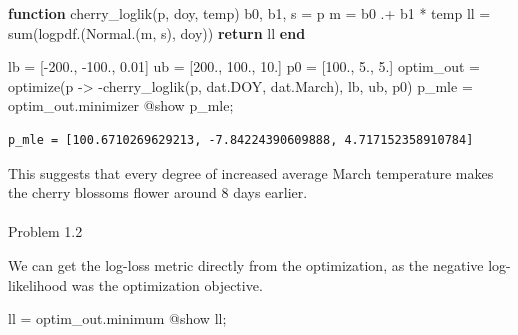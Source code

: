 \documentclass[
  letterpaper,
  DIV=11,
  numbers=noendperiod]{scrartcl}
\makeatletter
\let\oldparagraph\paragraph
\renewcommand{\paragraph}{
    \@ifstar
      \xxxParagraphStar
      \xxxParagraphNoStar
  }
\newcommand{\xxxParagraphStar}[1]{\oldparagraph*{#1}\mbox{}}
\newcommand{\xxxParagraphNoStar}[1]{\oldparagraph{#1}\mbox{}}
\newenvironment{Shaded}{\begin{snugshade}}{\end{snugshade}}
\newcommand{\ControlFlowTok}[1]{\textcolor[rgb]{0.00,0.23,0.31}{\textbf{#1}}}
\newcommand{\FloatTok}[1]{\textcolor[rgb]{0.68,0.00,0.00}{#1}}
\newcommand{\FunctionTok}[1]{\textcolor[rgb]{0.28,0.35,0.67}{#1}}
\newcommand{\KeywordTok}[1]{\textcolor[rgb]{0.00,0.23,0.31}{\textbf{#1}}}
\newcommand{\NormalTok}[1]{\textcolor[rgb]{0.00,0.23,0.31}{#1}}
\newcommand{\OperatorTok}[1]{\textcolor[rgb]{0.37,0.37,0.37}{#1}}
\newcommand{\PreprocessorTok}[1]{\textcolor[rgb]{0.68,0.00,0.00}{#1}}
\makeatother
\begin{document}
\begin{Shaded}
\begin{Highlighting}[]
\KeywordTok{function} \FunctionTok{cherry\_loglik}\NormalTok{(p, doy, temp)}
\NormalTok{    b0, b1, s }\OperatorTok{=}\NormalTok{ p}
\NormalTok{    m }\OperatorTok{=}\NormalTok{ b0 }\OperatorTok{.+}\NormalTok{ b1 }\OperatorTok{*}\NormalTok{ temp}
\NormalTok{    ll }\OperatorTok{=} \FunctionTok{sum}\NormalTok{(}\FunctionTok{logpdf}\NormalTok{.(}\FunctionTok{Normal}\NormalTok{.(m, s), doy))}
    \ControlFlowTok{return}\NormalTok{ ll}
\KeywordTok{end}

\NormalTok{lb }\OperatorTok{=}\NormalTok{ [}\OperatorTok{{-}}\FloatTok{200}\NormalTok{., }\OperatorTok{{-}}\FloatTok{100}\NormalTok{., }\FloatTok{0.01}\NormalTok{]}
\NormalTok{ub }\OperatorTok{=}\NormalTok{ [}\FloatTok{200}\NormalTok{., }\FloatTok{100}\NormalTok{., }\FloatTok{10}\NormalTok{.]}
\NormalTok{p0 }\OperatorTok{=}\NormalTok{ [}\FloatTok{100}\NormalTok{., }\FloatTok{5}\NormalTok{., }\FloatTok{5}\NormalTok{.]}
\NormalTok{optim\_out }\OperatorTok{=} \FunctionTok{optimize}\NormalTok{(p }\OperatorTok{{-}\textgreater{}} \FunctionTok{{-}cherry\_loglik}\NormalTok{(p, dat.DOY, dat.March), lb, ub, p0)}
\NormalTok{p\_mle }\OperatorTok{=}\NormalTok{ optim\_out.minimizer}
\PreprocessorTok{@show}\NormalTok{ p\_mle;}
\end{Highlighting}
\end{Shaded}

\begin{verbatim}
p_mle = [100.6710269629213, -7.84224390609888, 4.717152358910784]
\end{verbatim}

This suggests that every degree of increased average March temperature
makes the cherry blossoms flower around 8 days earlier.

\paragraph{Problem 1.2}\label{problem-1.2}

We can get the log-loss metric directly from the optimization, as the
negative log-likelihood was the optimization objective.

\begin{Shaded}
\begin{Highlighting}[]
\NormalTok{ll }\OperatorTok{=}\NormalTok{ optim\_out.minimum}
\PreprocessorTok{@show}\NormalTok{ ll;}
\end{Highlighting}
\end{Shaded}
\end{document}
